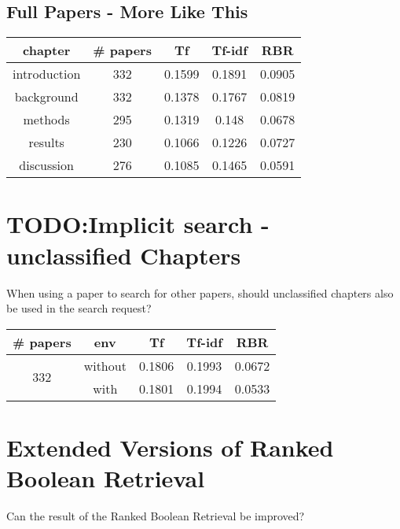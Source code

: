 \subsection{Full Papers - More Like This}
\begin{center}
  \begin{tabular}{ | c | c | c | c | c | }
    \hline
    \rowcolor{lightblue}
    \textbf{chapter} & \textbf{\# papers} & \textbf{Tf} & \textbf{Tf-idf} & \textbf{RBR} \\ \hline
    introduction & 332 & 0.1599 & 0.1891 & 0.0905 \\ \hline
    background   & 332 & 0.1378 & 0.1767 & 0.0819 \\ \hline
    methods      & 295 & 0.1319 & 0.148  & 0.0678 \\ \hline
    results      & 230 & 0.1066 & 0.1226 & 0.0727 \\ \hline
    discussion   & 276 & 0.1085 & 0.1465 & 0.0591 \\ \hline
  \end{tabular}
\end{center}


\section{TODO:Implicit search - unclassified Chapters}
When using a paper to search for other papers, should unclassified chapters also be used in the search request?
\begin{center}
  \begin{tabular}{ | c | c | c | c | c | }
    \hline
    \rowcolor{lightblue}
    \textbf{\# papers} & \textbf{env} & \textbf{Tf} & \textbf{Tf-idf} & \textbf{RBR} \\ \hline
    \multirow{2}{*}{332} & without & 0.1806 & 0.1993 & 0.0672 \\ \cline{2-5}
                         & with    & 0.1801 & 0.1994 & 0.0533 \\ \hline
  \end{tabular}
\end{center}


\section{Extended Versions of Ranked Boolean Retrieval}
Can the result of the Ranked Boolean Retrieval be improved?

